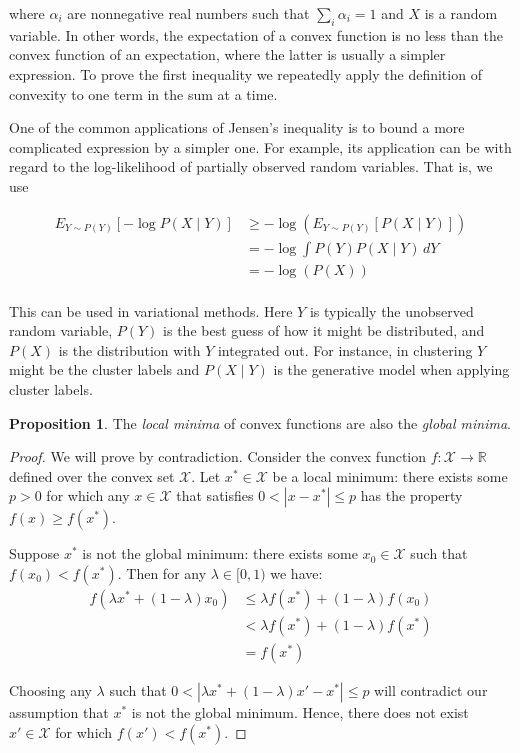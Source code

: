 \documentclass[a4paper,12pt]{article}
\theoremstyle{definition}
\newtheorem*{proposition}{Proposition}
\newcommand{\R}{\mathbb{R}}
\begin{document}
where $\alpha_i$ are nonnegative real numbers such that $\sum_i \alpha_i = 1$ and $X$ is
a random variable. In other words, the expectation of a convex function is no less than
the convex function of an expectation, where the latter is usually a simpler expression.
To prove the first inequality we repeatedly apply the definition of convexity to one term
in the sum at a time.

One of the common applications of Jensen's inequality is to bound a more complicated
expression by a simpler one. For example, its application can be with regard to the
log-likelihood of partially observed random variables. That is, we use


\begin{align*}
    E_{Y \sim P(Y)}[-\log P(X \mid Y)] & \geq -\log(E_{Y \sim P(Y)}[P(X \mid Y)]) \\
                                       & = -\log \int P(Y) P(X \mid Y) \,dY       \\
                                       & = -\log(P(X))                            \\
\end{align*}

This can be used in variational methods. Here $Y$ is typically the unobserved random variable, $P(Y)$ is the best guess of how it might be distributed, and $P(X)$
is the distribution with $Y$ integrated out. For instance, in clustering $Y$ might be the cluster labels and $P(X \mid Y)$ is the generative model when applying cluster labels.

\begin{proposition}
    The \emph{local minima} of convex functions are also the \emph{global minima}.
    \begin{proof}
        We will prove by contradiction.
        Consider the convex function $f: \mathcal{X} \to \R$ defined over the convex set $\mathcal{X}$.
        Let $x^{\ast} \in \mathcal{X}$ be a local minimum: there exists some $p > 0$ for which any
        $x \in \mathcal{X}$ that satisfies $0 < |x - x^{\ast}| \leq p$ has the property $f(x) \geq f(x^*)$.

        Suppose $x^{\ast}$ is not the global minimum: there exists some $x_0 \in \mathcal{X}$ such that
        $f(x_0) < f(x^{\ast})$.
        Then for any $\lambda \in [0, 1)$ we have:
        \begin{align*}
            f(\lambda x^\ast+ (1- \lambda)x_0) & \leq \lambda f(x^\ast)+(1-\lambda)f(x_0) \\
                                & < \lambda f(x^\ast)+(1-\lambda)f(x^\ast) \\
                                & = f(x^\ast)
        \end{align*}

        Choosing any $\lambda$ such that $0 < |\lambda x^{\ast} + (1-\lambda) x' - x^{\ast}| \leq p$ will contradict 
        our assumption that $x^{\ast}$ is not the global minimum. Hence, there does not exist $x' \in \mathcal{X}$ for
        which $f(x') < f(x^{\ast})$.

    \end{proof}
\end{proposition}
\end{document}
